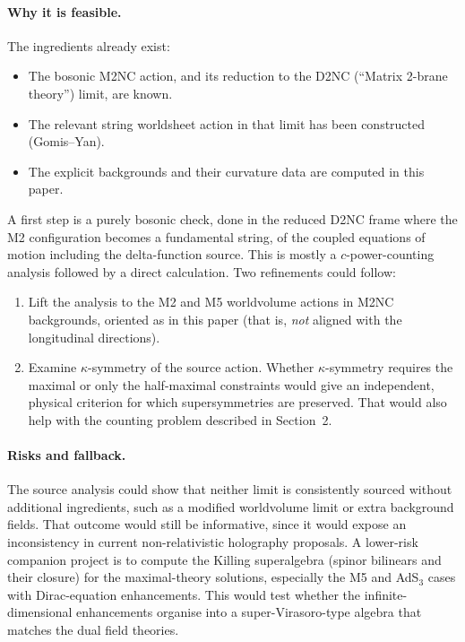 \documentclass[11pt]{article}
\begin{document}
\paragraph{Why it is feasible.} The ingredients already exist:
\begin{itemize}
  \item The bosonic M2NC action, and its reduction to the D2NC (``Matrix 2-brane theory'')
  limit, are known.
  \item The relevant string worldsheet action in that limit has been constructed
  (Gomis--Yan).
  \item The explicit backgrounds and their curvature data are computed in this paper.
\end{itemize}
A first step is a purely bosonic check, done in the reduced D2NC frame where the M2
configuration becomes a fundamental string, of the coupled equations of motion including the
delta-function source. This is mostly a $c$-power-counting analysis followed by a direct
calculation. Two refinements could follow:
\begin{enumerate}
  \item Lift the analysis to the M2 and M5 worldvolume actions in M2NC backgrounds, oriented
  as in this paper (that is, \emph{not} aligned with the longitudinal directions).
  \item Examine $\kappa$-symmetry of the source action. Whether $\kappa$-symmetry requires the
  maximal or only the half-maximal constraints would give an independent, physical criterion
  for which supersymmetries are preserved. That would also help with the counting problem
  described in Section~2.
\end{enumerate}

\paragraph{Risks and fallback.} The source analysis could show that neither limit is
consistently sourced without additional ingredients, such as a modified worldvolume limit or
extra background fields. That outcome would still be informative, since it would expose an
inconsistency in current non-relativistic holography proposals. A lower-risk companion
project is to compute the Killing superalgebra (spinor bilinears and their closure) for the
maximal-theory solutions, especially the M5 and AdS$_3$ cases with Dirac-equation
enhancements. This would test whether the infinite-dimensional enhancements organise into a
super-Virasoro-type algebra that matches the dual field theories.
\end{document}

